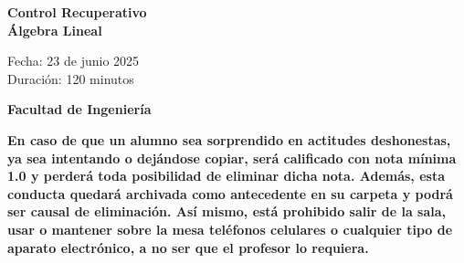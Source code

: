 \documentclass[a4paper]{article}
\begin{document}
\thispagestyle{fancy}
\vspace*{1cm}

\begin{minipage}[r]{12cm}
    \begin{flushright}
    \end{flushright}
\end{minipage}

\begin{center}
\Large{\textbf{Control Recuperativo\\ Álgebra Lineal\\ }}
\end{center}
\vspace{1cm}
\begin{minipage}[r]{15cm}
\begin{flushleft}

Fecha: 23 de junio 2025 \\%
Duración: 120 minutos  \\

\end{flushleft}
\end{minipage}
\vspace{2cm}
\begin{center}
\Large{\textbf{Facultad de Ingeniería}}
\end{center}
\vspace{1cm}
\textbf{En caso de que un alumno sea sorprendido en actitudes deshonestas, ya sea intentando o
dejándose copiar, será calificado con nota mínima 1.0 y perderá toda posibilidad de eliminar
dicha nota. Además, esta conducta quedará archivada como antecedente en su carpeta y
podrá ser causal de eliminación.
Así mismo, está prohibido salir de la sala, usar o mantener sobre la mesa teléfonos celulares
o cualquier tipo de aparato electrónico, a no ser que el profesor lo requiera.}\\



\vspace{5cm}
\newpage
\thispagestyle{empty}
\end{document}
